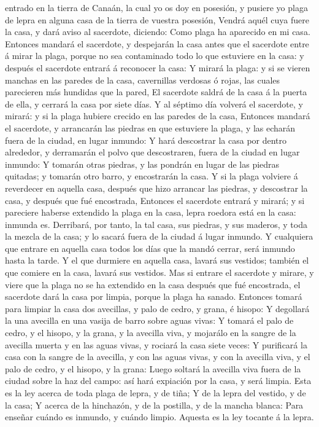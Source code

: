 entrado en la tierra de Canaán, la cual yo os doy en posesión, y pusiere
yo plaga de lepra en alguna casa de la tierra de vuestra posesión,
 Vendrá aquél cuya fuere la casa, y dará aviso al
sacerdote, diciendo: Como plaga ha aparecido en mi casa. 
Entonces mandará el sacerdote, y despejarán la casa antes que el
sacerdote entre á mirar la plaga, porque no sea contaminado todo lo que
estuviere en la casa: y después el sacerdote entrará á reconocer la
casa:  Y mirará la plaga: y si se vieren manchas en las
paredes de la casa, cavernillas verdosas ó rojas, las cuales parecieren
más hundidas que la pared,  El sacerdote saldrá de la casa
á la puerta de ella, y cerrará la casa por siete días.  Y
al séptimo día volverá el sacerdote, y mirará: y si la plaga hubiere
crecido en las paredes de la casa,  Entonces mandará el
sacerdote, y arrancarán las piedras en que estuviere la plaga, y las
echarán fuera de la ciudad, en lugar inmundo:  Y hará
descostrar la casa por dentro alrededor, y derramarán el polvo que
descostraren, fuera de la ciudad en lugar inmundo:  Y
tomarán otras piedras, y las pondrán en lugar de las piedras quitadas; y
tomarán otro barro, y encostrarán la casa.  Y si la plaga
volviere á reverdecer en aquella casa, después que hizo arrancar las
piedras, y descostrar la casa, y después que fué encostrada,
 Entonces el sacerdote entrará y mirará; y si pareciere
haberse extendido la plaga en la casa, lepra roedora está en la casa:
inmunda es.  Derribará, por tanto, la tal casa, sus
piedras, y sus maderos, y toda la mezcla de la casa; y lo sacará fuera
de la ciudad á lugar inmundo.  Y cualquiera que entrare en
aquella casa todos los días que la mandó cerrar, será inmundo hasta la
tarde.  Y el que durmiere en aquella casa, lavará sus
vestidos; también el que comiere en la casa, lavará sus vestidos.
 Mas si entrare el sacerdote y mirare, y viere que la plaga
no se ha extendido en la casa después que fué encostrada, el sacerdote
dará la casa por limpia, porque la plaga ha sanado. 
Entonces tomará para limpiar la casa dos avecillas, y palo de cedro, y
grana, é hisopo:  Y degollará la una avecilla en una vasija
de barro sobre aguas vivas:  Y tomará el palo de cedro, y
el hisopo, y la grana, y la avecilla viva, y mojarálo en la sangre de la
avecilla muerta y en las aguas vivas, y rociará la casa siete veces:
 Y purificará la casa con la sangre de la avecilla, y con
las aguas vivas, y con la avecilla viva, y el palo de cedro, y el
hisopo, y la grana:  Luego soltará la avecilla viva fuera
de la ciudad sobre la haz del campo: así hará expiación por la casa, y
será limpia.  Esta es la ley acerca de toda plaga de lepra,
y de tiña;  Y de la lepra del vestido, y de la casa;
 Y acerca de la hinchazón, y de la postilla, y de la mancha
blanca:  Para enseñar cuándo es inmundo, y cuándo limpio.
Aquesta es la ley tocante á la lepra.

